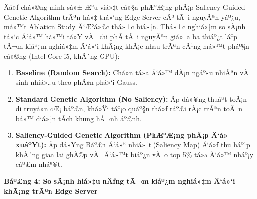 \documentclass[]{article}
\begin{document}
Äá»ƒ chá»©ng minh sá»± Æ°u viá»‡t cá»§a phÆ°Æ¡ng phÃ¡p Saliency-Guided Genetic
Algorithm trÃªn há»‡ thá»‘ng Edge Server cÃ³ tÃ i nguyÃªn yáº¿u, má»™t Ablation 
Study Ä‘Æ°á»£c thá»±c hiá»‡n. Thá»±c nghiá»‡m so sÃ¡nh tá»‘c Ä‘á»™ há»™i
tá»¥ vÃ  chi phÃ­ tÃ i nguyÃªn giá»¯a ba thiáº¿t láº­p tÃ¬m kiáº¿m nghiá»‡m
Ä‘á»‘i khÃ¡ng khÃ¡c nhau trÃªn cÃ¹ng má»™t pháº§n cá»©ng (Intel Core i5, khÃ´ng GPU):

\begin{enumerate}
\def\labelenumi{\arabic{enumi}.}
\item
  \textbf{Baseline (Random Search):} Chá»n tá»a Ä‘á»™ dÃ¡n ngáº«u nhiÃªn vÃ  sinh
  nhiá»…u theo phÃ¢n phá»‘i Gauss.
\item
  \textbf{Standard Genetic Algorithm (No Saliency):} Ãp dá»¥ng thuáº­t toÃ¡n
  di truyá»n cÆ¡ báº£n, khá»Ÿi táº¡o quáº§n thá»ƒ ráº£i rÃ¡c trÃªn toÃ n bá»™ diá»‡n tÃ­ch
  khung hÃ¬nh áº£nh.
\item
  \textbf{Saliency-Guided Genetic Algorithm (PhÆ°Æ¡ng phÃ¡p Ä‘á» xuáº¥t):} Ãp
  dá»¥ng Báº£n Ä‘á»“ nhiá»‡t (Saliency Map) Ä‘á»ƒ thu háº¹p khÃ´ng gian lai ghÃ©p vÃ  Ä‘á»™t
  biáº¿n vÃ o top 5\% tá»a Ä‘á»™ nháº¡y cáº£m nháº¥t.
\end{enumerate}

\textbf{Báº£ng 4: So sÃ¡nh hiá»‡u nÄƒng tÃ¬m kiáº¿m nghiá»‡m Ä‘á»‘i khÃ¡ng trÃªn Edge
Server}
\end{document}
